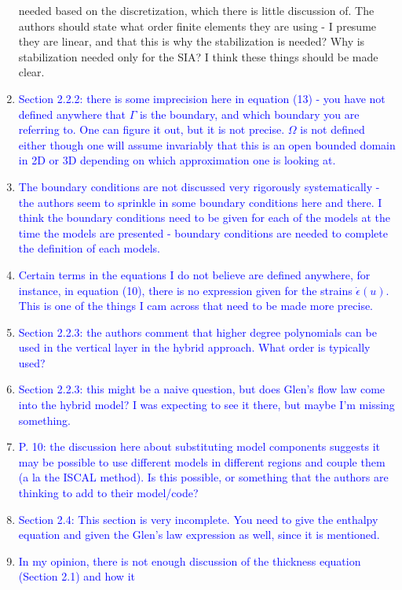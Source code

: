 \documentclass{article}
\theoremstyle{definition}
\theoremstyle{plain}
\begin{document}
\begin{enumerate}
{needed based on the discretization, which there is little discussion of. The authors should state what
order finite elements they are using - I presume they are linear, and that this is why the stabilization
is needed? Why is stabilization needed only for the SIA? I think these things should be made clear.}
\item \textcolor{blue}{Section 2.2.2: there is some imprecision here in equation (13) - you have not defined anywhere that $\Gamma$
is the boundary, and which boundary you are referring to. One can figure it out, but it is not precise.
$\Omega$ is not defined either though one will assume invariably that this is an open bounded domain in 2D
or 3D depending on which approximation one is looking at.}
\item \textcolor{blue}{The boundary conditions are not discussed very rigorously systematically - the authors seem to
sprinkle in some boundary conditions here and there. I think the boundary conditions need to be
given for each of the models at the time the models are presented - boundary conditions are needed
to complete the definition of each models.}
\item \textcolor{blue}{Certain terms in the equations I do not believe are defined anywhere, for instance, in equation (10),
there is no expression given for the strains $\dot\epsilon(u)$.
This is one of the things I cam across that need to
be made more precise.}
\item \textcolor{blue}{Section 2.2.3: the authors comment that higher degree polynomials can be used in the vertical layer
in the hybrid approach. What order is typically used?}
\item \textcolor{blue}{Section 2.2.3: this might be a naive question, but does Glen’s flow law come into the hybrid model?
I was expecting to see it there, but maybe I’m missing something.}
\item \textcolor{blue}{P. 10: the discussion here about substituting model components suggests it may be possible to use
different models in different regions and couple them (a la the ISCAL method). Is this possible, or
something that the authors are thinking to add to their model/code?}
\item \textcolor{blue}{Section 2.4: This section is very incomplete. You need to give the enthalpy equation and given the
Glen’s law expression as well, since it is mentioned.}
\item \textcolor{blue}{In my opinion, there is not enough discussion of the thickness equation (Section 2.1) and how it
}
\end{enumerate}
\end{document}
